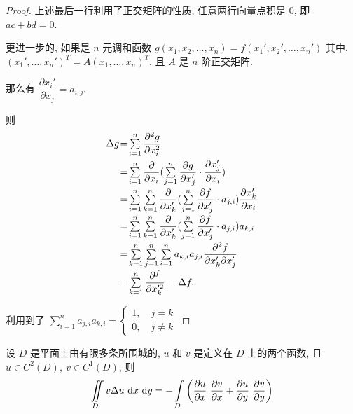 \begin{proof}
	上述最后一行利用了正交矩阵的性质, 任意两行向量点积是 $0$, 即 $ac+bd=0$.

	更进一步的, 如果是 $n$ 元调和函数 $g(x_1,x_2,\ldots,x_n)=f(x_1',x_2',\ldots,x_n')$ 其中, $(x_1',\ldots,x_n')^T=A(x_1,\ldots,x_n)^T$, 且 $A$ 是 $n$ 阶正交矩阵.

	那么有 $\dfrac{\partial x_i'}{\partial x_j}=a_{i,j}$.

	则
	\begin{equation*}
		\setlength{\arraycolsep}{0.5pt}
		\begin{array}{rcl}
			\Delta g &=&\sum\limits_{i=1}^n \dfrac{\partial^2 g}{\partial x_i^2}\\ [10pt]
			&=& \sum\limits_{i=1}^n \dfrac{\partial}{\partial x_i}(\sum\limits_{j=1}^n\dfrac{\partial g}{\partial x_j'}\cdot\dfrac{\partial x_j'}{\partial x_i}) \\ [10pt]
			&=& \sum\limits_{i=1}^n \sum\limits_{k=1}^n \dfrac{\partial}{\partial x_k'}(\sum\limits_{j=1}^n\dfrac{\partial f}{\partial x_j'}\cdot a_{j,i})\dfrac{\partial x_k'}{\partial x_i} \\ [10pt]
			&=& \sum\limits_{i=1}^n \sum\limits_{k=1}^n \dfrac{\partial}{\partial x_k'}(\sum\limits_{j=1}^n\dfrac{\partial f}{\partial x_j'}\cdot a_{j,i}) a_{k,i} \\ [10pt]
			&=&\sum\limits_{k=1}^n\sum\limits_{j=1}^n\sum\limits_{i=1}^n a_{k,i}a_{j,i}\dfrac{\partial^2 f}{\partial x_k'\partial x_j'} \\ [10pt]
			&=&\sum\limits_{k=1}^n \dfrac{\partial^f}{\partial x_k'^2}=\Delta f.
		\end{array}
	\end{equation*}

	利用到了 $\sum\limits_{i=1}^n a_{j,i}a_{k,i}=\left\{\begin{array}{c}
		1,\quad j=k \\
		0,\quad j\neq k
	\end{array}\right.$
\end{proof}

\begin{lemma}
	设 $D$ 是平面上由有限多条所围城的, $u$ 和 $v$ 是定义在 $D$ 上的两个函数, 且 $u\in C^2(D),\ v \in C^1(D)$, 则 $$\iint\limits_{D}v\Delta u\ \text {d} x\ \text {d} y = -\int\limits_{D}\left(\frac{\partial u}{\partial x}\ \frac{\partial v}{\partial x}+\frac{\partial u}{\partial y}\ \frac{\partial v}{\partial y}\right)$$
\end{lemma}
